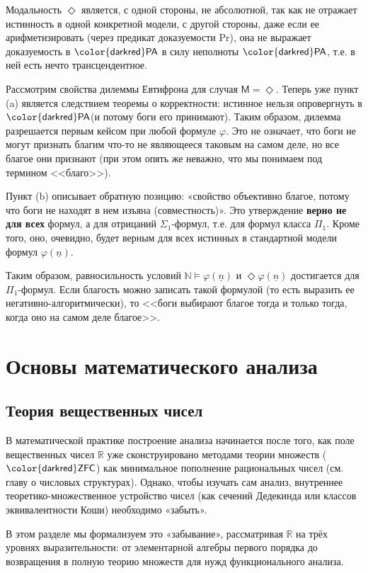 \documentclass[11pt, a4paper]{extarticle}
\newcommand{\ph}{\varphi}
\newcommand{\R}{{\mathbb R}}
\newcommand{\N}{{\mathbb N}}
\newcommand{\ZFC}{\ifmmode \mathsf{\color{darkred}ZFC}\else ${\mathsf{\color{darkred}ZFC}}$\fi\xspace}
\newcommand{\PA}{\ifmmode \mathsf{\color{darkred}PA}\else ${\mathsf{\color{darkred}PA}}$\fi\xspace}
\renewcommand{\Pr}{\mathrm{Pr}}
\newcommand{\numeral}[1]{\underline{#1}}
\newcommand{\Mod}{\mathsf M}
\begin{document}
Модальность $\Diamond$ является, с одной стороны, не абсолютной, так как не отражает истинность в одной конкретной модели, с другой стороны, даже если ее арифметизировать (через предикат доказуемости $\Pr$), она не выражает доказуемость в \PA в силу неполноты \PA, т.е. в ней есть нечто трансцендентное.


Рассмотрим свойства дилеммы Евтифрона для случая $\Mod=\Diamond$.
Теперь уже пункт (a) является следствием теоремы о корректности: истинное нельзя опровергнуть в \PA (и потому боги его принимают). Таким образом, дилемма разрешается первым кейсом при любой формуле $\ph$. Это не означает, что боги не могут признать благим что-то не являющееся таковым на самом деле, но все благое они признают (при этом опять же неважно, что мы понимаем под термином <<благо>>).


Пункт (b) описывает обратную позицию: «свойство объективно благое, потому что боги не находят в нем изъяна (совместность)». Это утверждение \textbf{верно не для всех} формул, а для отрицаний $\Sigma_1$-формул, т.е. для формул класса $\Pi_1$. Кроме того, оно, очевидно, будет верным для всех истинных в стандартной модели формул $\ph(\numeral n)$.

Таким образом, равносильность условий $\N\models\ph(\numeral n)$ и $\Diamond\ph(\numeral n)$ достигается для $\Pi_1$-формул. Если благость можно записать такой формулой (то есть выразить ее негативно-алгоритмически), то <<боги выбирают благое тогда и только тогда, когда оно на самом деле благое>>.



\newpage

\section{Основы математического анализа}


\subsection{Теория вещественных чисел}

В математической практике построение анализа начинается после того, как поле вещественных чисел $\R$ уже сконструировано методами теории множеств (\ZFC) как минимальное пополнение рациональных чисел (см. главу о числовых структурах). Однако, чтобы изучать сам анализ, внутреннее теоретико-множественное устройство чисел (как сечений Дедекинда или классов эквивалентности Коши) необходимо «забыть». 

В этом разделе мы формализуем это «забывание», рассматривая $\R$ на трёх уровнях выразительности: от элементарной алгебры первого порядка до возвращения в полную теорию множеств для нужд функционального анализа.
\end{document}
